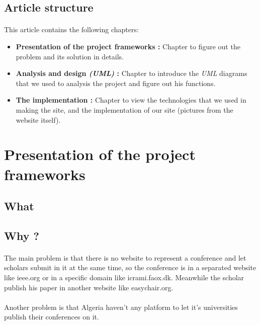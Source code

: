\documentclass[12pt,a4paper]{article}
\begin{document}
	\subsection{Article structure}
	\paragraph{}
	This article contains the following chapters:
	\begin{itemize}
		
		\item \textbf{Presentation of the project frameworks :}
		Chapter to figure out the problem and its solution in details.
		
		\item \textbf{Analysis and design \textit{(UML)} :}
		Chapter to introduce the \textit{UML} diagrams that we used to analysis the project and figure out his functions.
		
		\item \textbf{The implementation :}
		Chapter to view  the technologies that we used in making the site, and the implementation of our site (pictures from the website itself).
		
	\end{itemize}

	\clearpage
	\section{Presentation of the project frameworks}
		\subsection{What}
		\paragraph{}
		\subsection{Why ?}
		\paragraph{}
		The main problem is that there is no website to represent a conference and let scholars submit in it at the same time, so the conference is in a separated website like ieee.org or in a specific domain like icrami.faox.dk. Meanwhile the scholar publish his paper in another website like easychair.org.
		\paragraph{}
		Another problem is that Algeria haven't any platform to let it's universities publish their conferences on it.
\end{document}

